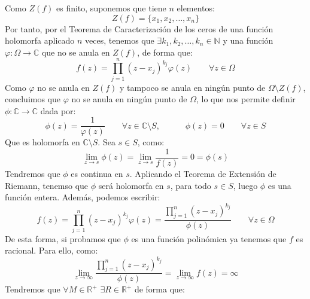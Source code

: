 \documentclass[12pt]{article}
\begin{document}
\begin{ejercicio}[2.5 puntos]
\begin{enumerate}[label=\alph*)]
                Como $Z(f)$ es finito, suponemos que tiene $n$ elementos:
                \begin{equation*}
                    Z(f) = \{x_1,x_2,\ldots,x_n\}
                \end{equation*}
                Por tanto, por el Teorema de Caracterización de los ceros de una función holomorfa aplicado $n$ veces, tenemos que $\exists k_1,k_2,\ldots,k_n \in \mathbb{N}$ y una función $\varphi:\Omega\to \mathbb{C}$ que no se anula en $Z(f)$, de forma que:
                \begin{equation*}
                    f(z) = \prod_{j=1}^{n}{(z-x_j)}^{k_j} \varphi(z) \qquad \forall z\in \Omega
                \end{equation*}
                Como $\varphi$ no se anula en $Z(f)$ y tampoco se anula en ningún punto de $\Omega\setminus Z(f)$, concluimos que $\varphi$ no se anula en ningún punto de $\Omega$, lo que nos permite definir $\phi:\mathbb{C}\to \mathbb{C}$ dada por:
                \begin{equation*}
                    \phi(z) = \dfrac{1}{\varphi(z)} \qquad \forall z\in \mathbb{C}\setminus S, \quad \qquad \phi(z) = 0 \qquad \forall z\in S
                \end{equation*}
                Que es holomorfa en $\mathbb{C}\setminus S$. Sea $s\in S$, como:
                \begin{equation*}
                    \lim_{z\to s} \phi(z) = \lim_{z\to s} \dfrac{1}{f(z)} = 0 = \phi(s)
                \end{equation*}
                Tendremos que $\phi$ es continua en $s$. Aplicando el Teorema de Extensión de Riemann, tenemso que $\phi$ será holomorfa en $s$, para todo $s\in S$, luego $\phi$ es una función entera. Además, podemos escribir:
                \begin{equation*}
                    f(z) = \prod_{j=1}^{n}{(z-x_j)}^{k_j} \varphi(z) = \dfrac{\prod\limits_{j=1}^{n}{(z-x_j)}^{k_j}}{\phi(z)} \qquad \forall z\in \Omega
                \end{equation*}
                De esta forma, si probamos que $\phi$ es una función polinómica ya tenemos que $f$ es racional. Para ello, como:
                \begin{equation*}
                    \lim_{z\to\infty} \dfrac{\prod\limits_{j=1}^{n}{(z-x_j)}^{k_j}}{\phi(z)} = \lim_{z\to\infty} f(z) =  \infty
                \end{equation*}
                Tendremos que $\forall M\in \mathbb{R}^+$ $\exists R\in \mathbb{R}^+$ de forma que:

\end{enumerate}
\end{ejercicio}
\end{document}
